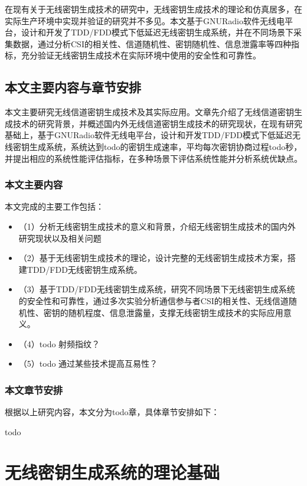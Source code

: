 \documentclass[master]{seuthesis} %
\begin{document}
\begin{Main}
在现有关于无线密钥生成技术的研究中，无线密钥生成技术的理论和仿真居多，在实际生产环境中实现并验证的研究并不多见。本文基于GNURadio软件无线电平台，设计和开发了TDD/FDD模式下低延迟无线密钥生成系统，并在不同场景下采集数据，通过分析CSI的相关性、信道随机性、密钥随机性、信息泄露率等四种指标，充分验证无线密钥生成技术在实际环境中使用的安全性和可靠性。

\section{本文主要内容与章节安排}

本文主要研究无线信道密钥生成技术及其实际应用。文章先介绍了无线信道密钥生成技术的研究背景，并概述国内外无线信道密钥生成技术的研究现状，在现有研究基础上，基于GNURadio软件无线电平台，设计和开发TDD/FDD模式下低延迟无线密钥生成系统，系统达到todo的密钥生成速率，平均每次密钥协商过程todo秒，并提出相应的系统性能评估指标，在多种场景下评估系统性能并分析系统优缺点。

\subsection{本文主要内容}

本文完成的主要工作包括：

\begin{itemize}
    \item（1）分析无线密钥生成技术的意义和背景，介绍无线密钥生成技术的国内外研究现状以及相关问题
    \item（2）基于无线密钥生成技术的理论，设计完整的无线密钥生成技术方案，搭建TDD/FDD无线密钥生成系统。
    \item（3）基于TDD/FDD无线密钥生成系统，研究不同场景下无线密钥生成系统的安全性和可靠性，通过多次实验分析通信参与者CSI的相关性、无线信道随机性、密钥的随机程度、信息泄露量，支撑无线密钥生成技术的实际应用意义。
    \item（4）todo 射频指纹？
    \item（5）todo 通过某些技术提高互易性？
\end{itemize}

\subsection{本文章节安排}

根据以上研究内容，本文分为todo章，具体章节安排如下：

todo

\chapter{无线密钥生成系统的理论基础}


\end{Main}
\end{document}
